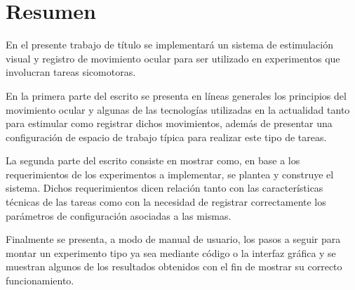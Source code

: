 \documentclass[\main/main.tex]{subfiles}
\begin{document}
\chapter{Resumen}
	En el presente trabajo de título se implementará un sistema de estimulación visual y registro de movimiento ocular para ser utilizado en experimentos que involucran tareas sicomotoras. 
	
	En la primera parte del escrito se presenta en líneas generales los principios del movimiento ocular y algunas de las tecnologías utilizadas en la actualidad tanto para estimular como registrar dichos movimientos, además de presentar una configuración de espacio de trabajo típica para realizar este tipo de tareas.

	La segunda parte del escrito consiste en mostrar como, en base a los requerimientos de los experimentos a implementar, se plantea y construye el sistema. Dichos requerimientos dicen relación tanto con las características técnicas de las tareas como con la necesidad de registrar correctamente los parámetros de configuración asociadas a las mismas. 

	Finalmente se presenta, a modo de manual de usuario, los pasos a seguir para montar un experimento tipo ya sea mediante código o la interfaz gráfica y se muestran algunos de los resultados obtenidos con el fin de mostrar su correcto funcionamiento.
	
	
\end{document}
